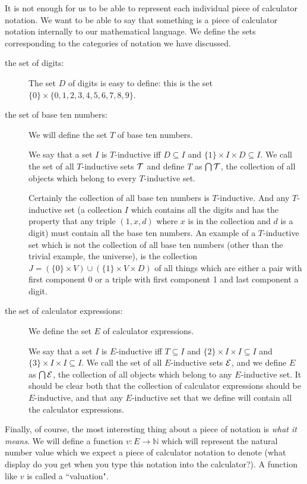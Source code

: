 \documentclass[12pt]{book}
\begin{document}
It is not enough for us to be able to represent each individual piece of calculator notation.  We want to be able to say that something is a piece of calculator notation internally to our mathematical language.  We define the sets corresponding to the categories of notation we have discussed.

\begin{description}

\item[the set of digits:]  The set $D$ of digits is easy to define:  this is the set $\{0\} \times \{0,1,2,3,4,5,6,7,8,9\}$.

\item[the set of base ten numbers:]  We will define the set $T$ of base ten numbers.  

We say that a set $I$ is $T$-inductive iff $D \subseteq I$ and $\{1\} \times I \times D \subseteq I$.  We call the set of all $T$-inductive sets ${\cal T}$ and define
$T$ as $\bigcap {\cal T}$, the collection of all objects which belong to every $T$-inductive set.

Certainly the collection of all base ten numbers is $T$-inductive.  And any $T$-inductive set (a collection $I$ which contains all the digits and has the property that any triple $(1,x,d)$
where $x$ is in the collection and $d$ is a digit) must contain all the base ten numbers.  An example of a $T$-inductive set which is not the collection of all base ten numbers
(other than the trivial example, the universe), is the collection $J=(\{0\} \times V)\cup (\{1\} \times V \times D)$ of all things which are either a pair with first component 0 or
a triple with first component 1 and last component a digit.

\item[the set of calculator expressions:]  We define the set $E$ of calculator expressions.

We say that a set $I$ is $E$-inductive iff $T \subseteq I$ and $\{2\} \times I \times I \subseteq I$ and $\{3\} \times I \times I \subseteq I$.
We call the set of all $E$-inductive sets ${\cal E}$, and we define $E$ as $\bigcap {\cal E}$, the collection of all objects which belong to any $E$-inductive set.
It should be clear both that the collection of calculator expressions should be $E$-inductive, and that any $E$-inductive set that we define will contain all the calculator expressions.

\end{description}

Finally, of course, the most interesting thing about a piece of notation is {\em what it means\/}.  We will define a function $v:E \rightarrow {\mathbb N}$ which will represent the natural number value which we expect a piece of calculator notation to denote (what display do you get when you type this notation into the calculator?).  A function like $v$ is called a ``valuation".
\end{document}
